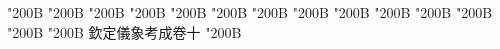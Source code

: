 \begin{正文}
\char"200B\relax{}
\char"200B\relax{}
\char"200B\relax{}
\char"200B\relax{}
\char"200B\relax{}
\char"200B\relax{}
\char"200B\relax{}
\char"200B\relax{}
\char"200B\relax{}
\char"200B\relax{}
\char"200B\relax{}
\char"200B\relax{}
\char"200B\relax{}
\char"200B\relax{}
欽定儀象考成卷十
\char"200B\relax
\par

\par\end{正文}\clearpage
